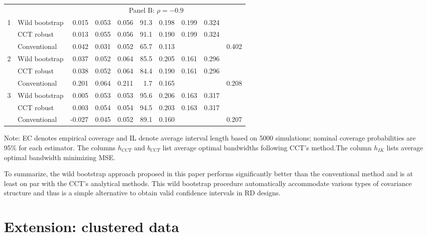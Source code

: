 \documentclass[12pt,]{article}
\DeclareMathOperator{\1}{\mathbbm{1}}
\begin{document}
\begin{table}[ht]
\begin{threeparttable}
\begin{tabular}{llrrrrrrrr}
			&& \multicolumn{8}{c}{Panel B: $\rho = -0.9$} \\ \cline{3-10}
			1 & Wild bootstrap & 0.015 & 0.053 & 0.056 & 91.3 & 0.198 & 0.199 & 0.324 &  \\ 
			& CCT robust & 0.013 & 0.055 & 0.056 & 91.1 & 0.190 & 0.199 & 0.324 &  \\ 
			& Conventional & 0.042 & 0.031 & 0.052 & 65.7 & 0.113 &  &  & 0.402 \\ 
			2 & Wild bootstrap & 0.037 & 0.052 & 0.064 & 85.5 & 0.205 & 0.161 & 0.296 &  \\ 
			& CCT robust & 0.038 & 0.052 & 0.064 & 84.4 & 0.190 & 0.161 & 0.296 &  \\ 
			& Conventional & 0.201 & 0.064 & 0.211 & 1.7 & 0.165 &  &  & 0.208 \\ 
			3 & Wild bootstrap & 0.005 & 0.053 & 0.053 & 95.6 & 0.206 & 0.163 & 0.317 &  \\ 
			& CCT robust & 0.003 & 0.054 & 0.054 & 94.5 & 0.203 & 0.163 & 0.317 &  \\ 
			& Conventional & -0.027 & 0.045 & 0.052 & 89.1 & 0.160 &  &  & 0.207 \\ 
			\hline
		\end{tabular}
		\begin{tablenotes}
			\small
			\item Note: EC denotes empirical coverage and IL denote average interval length based on 5000 simulations; nominal coverage probabilities are 95\% for each estimator. The columns $h_{CCT}$ and $b_{CCT}$ list average optimal bandwidths following CCT's method.The column $h_{IK}$ lists average optimal bandwidth minimizing MSE.
		\end{tablenotes}
	\end{threeparttable}
\end{table}

To summarize, the wild bootstrap approach proposed in this paper performs significantly better than the conventional method and is at least on par with the CCT's analytical methods. This wild bootstrap procedure automatically accommodate various types of covariance structure and thus is a simple alternative to obtain valid confidence intervals in RD designs. 

\section{Extension: clustered data}
\end{document}
